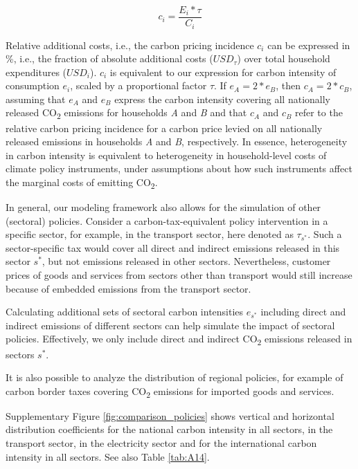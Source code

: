 \documentclass[12pt, a4paper]{article}
\begin{document}
\begin{refsection}
\begin{equation}
    c_{i} = \frac{E_{i}*\tau}{C_{i}}
\end{equation}

Relative additional costs, i.e., the carbon pricing incidence $c_{i}$ can be expressed in \%, i.e., the fraction of absolute additional costs ($USD_{\tau}$) over total household expenditures ($USD_{i}$). $c_{i}$ is equivalent to our expression for carbon intensity of consumption $e_{i}$, scaled by a proportional factor $\tau$. If $e_{A}=2*e_{B}$, then $c_{A}=2*c_{B}$, assuming that $e_{A}$ and $e_{B}$ express the carbon intensity covering all nationally released CO\textsubscript{2} emissions for households \textit{A} and \textit{B} and that $c_{A}$ and $c_{B}$ refer to the relative carbon pricing incidence for a carbon price levied on all nationally released emissions in households \textit{A} and \textit{B}, respectively. In essence, heterogeneity in carbon intensity is equivalent to heterogeneity in household-level costs of climate policy instruments, under assumptions about how such instruments affect the marginal costs of emitting CO\textsubscript{2}.

In general, our modeling framework also allows for the simulation of other (sectoral) policies. Consider a carbon-tax-equivalent policy intervention in a specific sector, for example, in the transport sector, here denoted as $\tau_{s^{*}}$. Such a sector-specific tax would cover all direct and indirect emissions released in this sector $s^{*}$, but not emissions released in other sectors. Nevertheless, customer prices of goods and services from sectors other than transport would still increase because of embedded emissions from the transport sector.

Calculating additional sets of sectoral carbon intensities $e_{s^{*}}$ including direct and indirect emissions of different sectors can help simulate the impact of sectoral policies. Effectively, we only include direct and indirect CO\textsubscript{2} emissions released in sectors $s^{*}$.

It is also possible to analyze the distribution of regional policies, for example of carbon border taxes covering CO\textsubscript{2} emissions for imported goods and services. 

Supplementary Figure \ref{fig:comparison_policies} shows vertical and horizontal distribution coefficients for the national carbon intensity in all sectors, in the transport sector, in the electricity sector and for the international carbon intensity in all sectors. See also Table \ref{tab:A14}.


\end{refsection}
\end{document}
